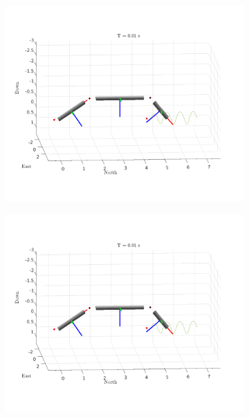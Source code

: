 \begin{figure}[h!]
\begin{subfigure}[b]{0.45\linewidth}
        \includegraphics[page=3,width=\linewidth]{assets/results/dynamic/gif.pdf}
    \end{subfigure}
    \begin{subfigure}[b]{0.45\linewidth}
        \includegraphics[page=4,width=\linewidth]{assets/results/dynamic/gif.pdf}
    \end{subfigure}
    \begin{subfigure}[b]{0.45\linewidth}

\end{subfigure}
\end{figure}
